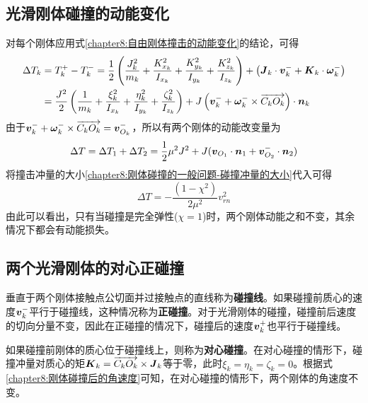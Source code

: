 \subsection{光滑刚体碰撞的动能变化}

对每个刚体应用式\eqref{chapter8:自由刚体撞击的动能变化}的结论，可得
\begin{align*}
	\Delta T_k & = T_k^+-T_k^- = \frac12 \left(\frac{J_k^2}{m_k} + \frac{K_{x_k}^2}{I_{x_k}} + \frac{K_{y_k}^2}{I_{y_k}} + \frac{K_{z_k}^2}{I_{z_k}}\right) + \left(\boldsymbol{J}_k\cdot \boldsymbol{v}_k^-+\boldsymbol{K}_k\cdot \boldsymbol{\omega}_k^-\right) \\
	& = \frac{J^2}{2}\left(\frac{1}{m_k} + \frac{\xi_k^2}{I_{x_k}} + \frac{\eta_k^2}{I_{y_k}} + \frac{\zeta_k^2}{I_{z_k}}\right) + J\left(\boldsymbol{v}_k^-+\boldsymbol{\omega}_k^-\times \overrightarrow{C_kO_k}\right) \cdot \boldsymbol{n}_k
\end{align*}
由于$\boldsymbol{v}_k^-+\boldsymbol{\omega}_k^-\times \overrightarrow{C_kO_k} = \boldsymbol{v}_{O_k}^-$，所以有两个刚体的动能改变量为
\begin{equation*}
	\Delta T = \Delta T_1+\Delta T_2 = \frac12 \mu^2J^2+J(\boldsymbol{v}_{O_1}\cdot \boldsymbol{n}_1 + \boldsymbol{v}_{O_2}^-\cdot \boldsymbol{n}_2)
\end{equation*}
将撞击冲量的大小\eqref{chapter8:刚体碰撞的一般问题-碰撞冲量的大小}代入可得
\begin{equation}
	\Delta T = -\frac{(1-\chi^2)}{2\mu^2}v_{rn}^2
	\label{chapter8:光滑刚体碰撞的动能变化式}
\end{equation}
由此可以看出，只有当碰撞是完全弹性($\chi=1$)时，两个刚体动能之和不变，其余情况下都会有动能损失。

\subsection{两个光滑刚体的对心正碰撞}

垂直于两个刚体接触点公切面并过接触点的直线称为{\bf 碰撞线}。如果碰撞前质心的速度$\boldsymbol{v}_k^-$平行于碰撞线，这种情况称为{\bf 正碰撞}。对于光滑刚体的碰撞，碰撞前后速度的切向分量不变，因此在正碰撞的情况下，碰撞后的速度$\boldsymbol{v}_k^+$也平行于碰撞线。

如果碰撞前刚体的质心位于碰撞线上，则称为{\bf 对心碰撞}。在对心碰撞的情形下，碰撞冲量对质心的矩$\boldsymbol{K}_k=\overrightarrow{C_kO_k}\times \boldsymbol{J}_k$等于零，此时$\xi_k=\eta_k=\zeta_k=0$。根据式\eqref{chapter8:刚体碰撞后的角速度}可知，在对心碰撞的情形下，两个刚体的角速度不变。

